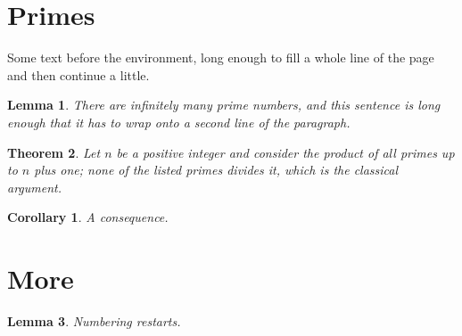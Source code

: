 \documentclass{article}
\newtheorem{theorem}{Theorem}[section]
\newtheorem{lemma}[theorem]{Lemma}
\newtheorem{corollary}{Corollary}[theorem]
\begin{document}
\section{Primes}
Some text before the environment, long enough to fill a whole line of the page and then continue a little.
\begin{lemma}
There are infinitely many prime numbers, and this sentence is long enough that it has to wrap onto a second line of the paragraph.
\end{lemma}
\begin{theorem}
Let $n$ be a positive integer and consider the product of all primes up to $n$ plus one; none of the listed primes divides it, which is the classical argument.
\end{theorem}
\begin{corollary}
A consequence.
\end{corollary}
\section{More}
\begin{lemma}
Numbering restarts.
\end{lemma}
\end{document}
